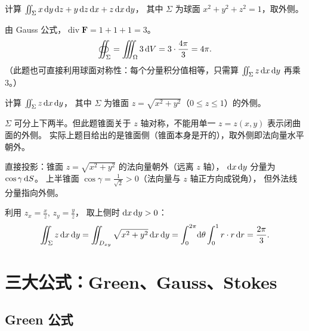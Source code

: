 \documentclass{article}
\DeclareMathOperator{\divergence}{div}
\begin{document}
\begin{exercise}
  计算 $\iint_\Sigma x \,\mathrm{d} y\,\mathrm{d} z + y \,\mathrm{d} z\,\mathrm{d} x + z \,\mathrm{d} x\,\mathrm{d} y$，
  其中 $\Sigma$ 为球面 $x^2+y^2+z^2 = 1$，取外侧。
\end{exercise}

\begin{solution}
  由 Gauss 公式，$\divergence \mathbf{F} = 1+1+1 = 3$。
  \[
    \oiint_\Sigma = \iiint_\Omega 3 \,\mathrm{d} V = 3 \cdot \frac{4\pi}{3} = 4\pi.
  \]
  （此题也可直接利用球面对称性：每个分量积分值相等，只需算 $\iint_\Sigma z\,\mathrm{d} x\,\mathrm{d} y$ 再乘 $3$。）
\end{solution}

\begin{exercise}
  计算 $\iint_\Sigma z \,\mathrm{d} x\,\mathrm{d} y$，
  其中 $\Sigma$ 为锥面 $z = \sqrt{x^2+y^2}$（$0 \le z \le 1$）的外侧。
\end{exercise}

\begin{solution}
  $\Sigma$ 可分上下两半。但此题锥面关于 $z$ 轴对称，不能用单一 $z=z(x,y)$ 表示闭曲面的外侧。
  实际上题目给出的是锥面侧（锥面本身是开的），取外侧即法向量水平朝外。

  直接投影：锥面 $z=\sqrt{x^2+y^2}$ 的法向量朝外（远离 $z$ 轴），
  $\mathrm{d} x\,\mathrm{d} y$ 分量为 $\cos\gamma\,\mathrm{d} S$。
  上半锥面 $\cos\gamma = \frac{1}{\sqrt{2}} > 0$（法向量与 $z$ 轴正方向成锐角），
  但外法线分量指向外侧。

  利用 $z_x = \frac{x}{z}$, $z_y = \frac{y}{z}$，
  取上侧时 $\mathrm{d} x\,\mathrm{d} y > 0$：
  \[
    \iint_\Sigma z \,\mathrm{d} x\,\mathrm{d} y
    = \iint_{D_{xy}} \sqrt{x^2+y^2} \,\mathrm{d} x\,\mathrm{d} y
    = \int_0^{2\pi}\!\mathrm{d}\theta \int_0^1 r \cdot r \,\mathrm{d} r
    = \frac{2\pi}{3}.
  \]
\end{solution}

\section{三大公式：Green、Gauss、Stokes}
\label{sec:three-formulas}

\subsection{Green 公式}
\label{sec:green}
\end{document}
